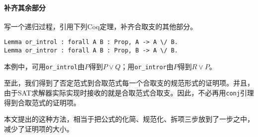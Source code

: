 \paragraph{补齐其余部分}
写一个递归过程，引用下列Coq定理，补齐合取支的其他部分。
\begin{verbatim}
Lemma or_introl : forall A B : Prop, A -> A \/ B.
Lemma or_intror : forall A B : Prop, B -> A \/ B.
\end{verbatim}
本例中，可用\texttt{or\_introl}由$P$得到$P \lor Q$；用\texttt{or\_intror}由$P$得到$R \lor P$。

至此，我们得到了否定范式到合取范式每一个合取支的规范形式的证明项。并且，由于SAT求解器实际实现时接收的就是合取范式合取支。因此，不必再用\texttt{conj}引理得到合取范式的证明项。

本文提出的这种方法，相当于把公式的化简、规范化、拆项三步放到了一步之中，减少了证明项的大小。
